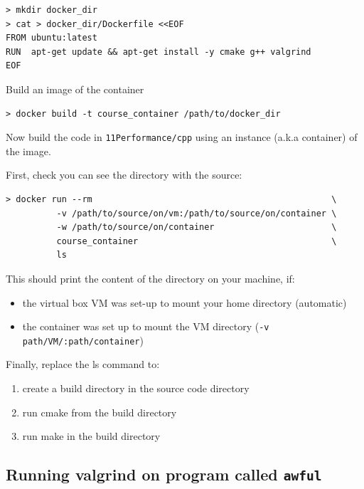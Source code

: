 \begin{verbatim}
> mkdir docker_dir
> cat > docker_dir/Dockerfile <<EOF
FROM ubuntu:latest
RUN  apt-get update && apt-get install -y cmake g++ valgrind
EOF
\end{verbatim}

Build an image of the container

\begin{verbatim}
> docker build -t course_container /path/to/docker_dir
\end{verbatim}

Now build the code in \texttt{11Performance/cpp} using an instance
(a.k.a container) of the image.

First, check you can see the directory with the source:

\begin{verbatim}
> docker run --rm                                               \
          -v /path/to/source/on/vm:/path/to/source/on/container \
          -w /path/to/source/on/container                       \
          course_container                                      \
          ls
\end{verbatim}

This should print the content of the directory on your machine, if:

\begin{itemize}
\itemsep1pt\parskip0pt
\item
  the virtual box VM was set-up to mount your home directory (automatic)
\item
  the container was set up to mount the VM directory
  (\texttt{-v path/VM/:path/container})
\end{itemize}

Finally, replace the ls command to:

\begin{enumerate}
\def\labelenumi{\arabic{enumi}.}
\itemsep1pt\parskip0pt\parsep0pt
\item
  create a build directory in the source code directory
\item
  run cmake from the build directory
\item
  run make in the build directory
\end{enumerate}

\subsection{Running valgrind on program called
\texttt{awful}}\label{running-valgrind-on-program-called-awful}

